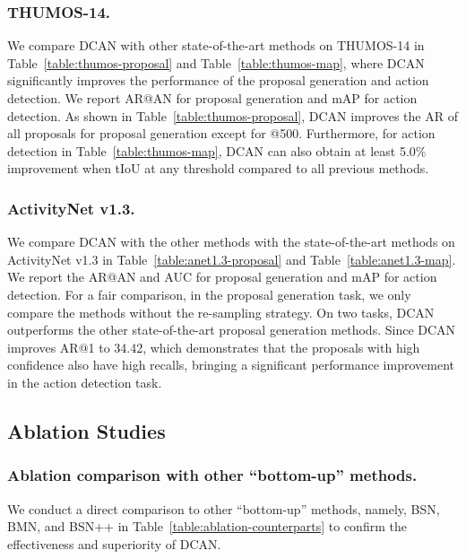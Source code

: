 \documentclass[letterpaper]{article} \usepackage{aaai22}  \usepackage{times}  \usepackage{helvet}  \usepackage{courier}  \usepackage[hyphens]{url}  \usepackage{graphicx} \urlstyle{rm} \def\UrlFont{\rm}  \usepackage{natbib}  \usepackage{caption} \DeclareCaptionStyle{ruled}{labelfont=normalfont,labelsep=colon,strut=off} \frenchspacing  \setlength{\pdfpagewidth}{8.5in}  \setlength{\pdfpageheight}{11in}  \usepackage{algorithm}
\begin{document}
\subsubsection{THUMOS-14.} 
We compare DCAN with other state-of-the-art methods on THUMOS-14 in Table~\ref{table:thumos-proposal} and Table~\ref{table:thumos-map}, where DCAN significantly improves the performance of the proposal generation and action detection. 
We report AR@AN for proposal generation and mAP for action detection.
As shown in Table~\ref{table:thumos-proposal}, DCAN improves the AR of all proposals for proposal generation except for @500.
Furthermore, for action detection in Table~\ref{table:thumos-map}, DCAN can also obtain at least 5.0\% improvement when tIoU at any threshold compared to all previous methods.

\subsubsection{ActivityNet v1.3.} 
We compare DCAN with the other methods with the state-of-the-art methods on ActivityNet v1.3 in Table~\ref{table:anet1.3-proposal} and Table~\ref{table:anet1.3-map}. 
We report the AR@AN and AUC for proposal generation and mAP for action detection. 
For a fair comparison, in the proposal generation task, we only compare the methods without the re-sampling strategy.
On two tasks, DCAN outperforms the other state-of-the-art proposal generation methods.
Since DCAN improves AR@1 to 34.42, which demonstrates that the proposals with high confidence also have high recalls, bringing a significant performance improvement in the action detection task.
















\subsection{Ablation Studies}



\subsubsection{Ablation comparison with other ``bottom-up'' methods.}
We conduct a direct comparison to other ``bottom-up'' methods, namely, BSN, BMN, and BSN++ in Table~\ref{table:ablation-counterparts} to confirm the effectiveness and superiority of DCAN. 
\end{document}
